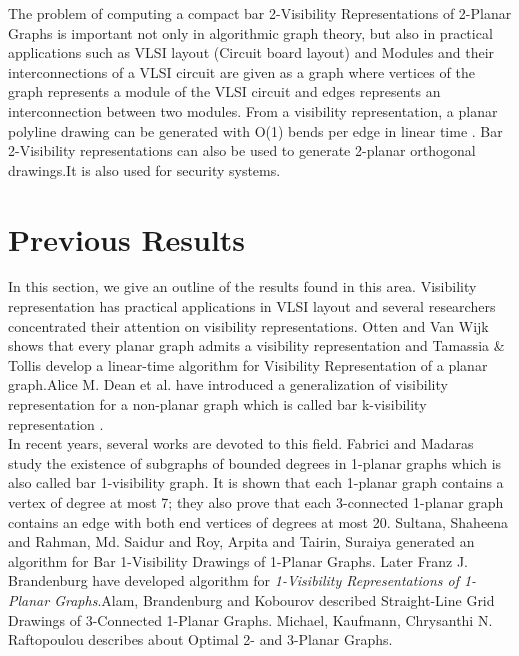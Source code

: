 The problem of computing a compact bar 2-Visibility Representations of 2-Planar Graphs is important not only in algorithmic graph theory, but also in practical applications such as VLSI layout (Circuit board layout) \cite{G} and Modules and their interconnections of a VLSI circuit are given as a graph where vertices of the graph represents a module of the VLSI circuit and edges represents an interconnection between two modules. From a visibility representation, a planar polyline drawing can be generated with O(1) bends per edge in linear time \cite{Nishizeki}. Bar 2-Visibility representations can also be used to generate 2-planar orthogonal drawings.It is also used for security systems.




\section{Previous Results}
\label{sec:results}
In this section, we give an outline of the results found in this area. Visibility representation has practical applications in VLSI layout \cite{G} and several researchers concentrated their attention on visibility representations. Otten and Van Wijk \cite{Otten} shows that every planar graph admits a visibility representation and Tamassia \& Tollis \cite{R} develop a linear-time algorithm for Visibility Representation of a planar graph.Alice M. Dean et al. have introduced a generalization of visibility representation for a non-planar graph which is called bar k-visibility representation \cite{M}.
\\
In recent years, several works are devoted to this field. Fabrici and Madaras \cite{madaras} study the existence of subgraphs of bounded degrees in 1-planar graphs which is also called bar 1-visibility graph. It is shown that each 1-planar graph contains a vertex of degree at most 7; they also prove that each 3-connected 1-planar graph contains an edge with both end vertices of degrees at most 20. Sultana, Shaheena and Rahman, Md. Saidur and Roy, Arpita and Tairin, Suraiya \cite{sultana} generated an algorithm for Bar 1-Visibility Drawings of 1-Planar Graphs. Later Franz J. Brandenburg \cite{FJ} have developed algorithm for \emph{1-Visibility Representations of 1-Planar Graphs}.Alam, Brandenburg and Kobourov \cite{alam} described Straight-Line Grid Drawings of 3-Connected 1-Planar Graphs. Michael, Kaufmann, Chrysanthi N. Raftopoulou \cite{michael} describes about Optimal 2- and 3-Planar Graphs.





